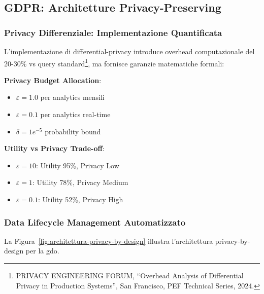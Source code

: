 \subsection{GDPR: Architetture Privacy-Preserving}
\label{subsec:gdpr-privacy-preserving}

\subsubsection{Privacy Differenziale: Implementazione Quantificata}

L'implementazione di \gls{differential-privacy} introduce overhead computazionale del 20-30\% vs query standard\footnote{PRIVACY ENGINEERING FORUM, ``Overhead Analysis of Differential Privacy in Production Systems'', San Francisco, PEF Technical Series, 2024.}, ma fornisce garanzie matematiche formali:

\textbf{Privacy Budget Allocation}:
\begin{itemize}
    \item $\varepsilon = 1.0$ per analytics mensili
    \item $\varepsilon = 0.1$ per analytics real-time
    \item $\delta = 1e^{-5}$ probability bound
\end{itemize}

\textbf{Utility vs Privacy Trade-off}:
\begin{itemize}
    \item $\varepsilon = 10$: Utility 95\%, Privacy Low
    \item $\varepsilon = 1$: Utility 78\%, Privacy Medium
    \item $\varepsilon = 0.1$: Utility 52\%, Privacy High
\end{itemize}

\subsubsection{Data Lifecycle Management Automatizzato}

La Figura~\ref{fig:architettura-privacy-by-design} illustra l'architettura privacy-by-design per la \gls{gdo}.


